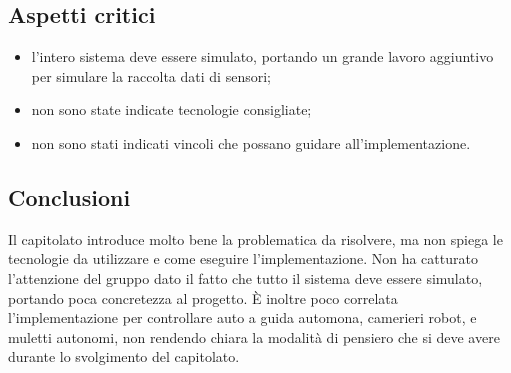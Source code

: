 \subsection{Aspetti critici}
\begin{itemize}
    \item l'intero sistema deve essere simulato, portando un grande lavoro aggiuntivo per simulare la raccolta dati di sensori;
    \item non sono state indicate tecnologie consigliate;
    \item non sono stati indicati vincoli che possano guidare all'implementazione.
\end{itemize}
\subsection{Conclusioni}
Il capitolato introduce molto bene la problematica da risolvere, ma non spiega le tecnologie da utilizzare e come eseguire l'implementazione.
Non ha catturato l'attenzione del gruppo dato il fatto che tutto il sistema deve essere simulato, portando poca concretezza al progetto.
È inoltre poco correlata l'implementazione per controllare auto a guida automona, camerieri robot, e muletti autonomi, non rendendo chiara la modalità di pensiero che si deve avere durante lo svolgimento del capitolato.